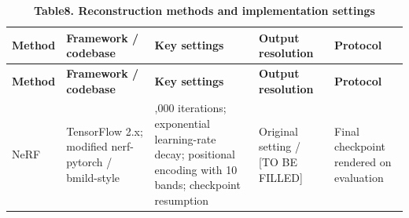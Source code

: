\begin{longtable}[]{@{}
  >{\centering\arraybackslash}p{}
  >{\centering\arraybackslash}p{}
  >{\centering\arraybackslash}p{}
  >{\centering\arraybackslash}p{}
  >{\centering\arraybackslash}p{}@{}}
\caption{\textbf{Table8. Reconstruction methods and implementation
settings}}\tabularnewline
\toprule\noalign{}
\begin{minipage}[b]{\linewidth}\centering
\textbf{Method}
\end{minipage} & \begin{minipage}[b]{\linewidth}\centering
\textbf{Framework / codebase}
\end{minipage} & \begin{minipage}[b]{\linewidth}\centering
\textbf{Key settings}
\end{minipage} & \begin{minipage}[b]{\linewidth}\centering
\textbf{Output resolution}
\end{minipage} & \begin{minipage}[b]{\linewidth}\centering
\textbf{Protocol}
\end{minipage} \\
\midrule\noalign{}
\endfirsthead
\toprule\noalign{}
\begin{minipage}[b]{\linewidth}\centering
\textbf{Method}
\end{minipage} & \begin{minipage}[b]{\linewidth}\centering
\textbf{Framework / codebase}
\end{minipage} & \begin{minipage}[b]{\linewidth}\centering
\textbf{Key settings}
\end{minipage} & \begin{minipage}[b]{\linewidth}\centering
\textbf{Output resolution}
\end{minipage} & \begin{minipage}[b]{\linewidth}\centering
\textbf{Protocol}
\end{minipage} \\
\midrule\noalign{}
\endhead
\bottomrule\noalign{}
\endlastfoot
NeRF & TensorFlow 2.x; modified nerf-pytorch / bmild-style &
200,000 iterations; exponential learning-rate decay; positional
encoding with 10 bands; checkpoint resumption & Original setting /
[TO BE FILLED] & Final checkpoint rendered on evaluation

\end{longtable}

